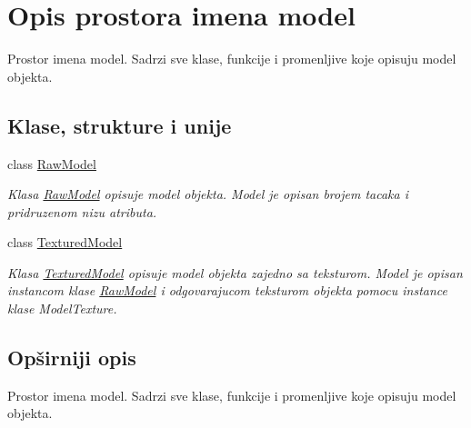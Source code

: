 \hypertarget{namespacemodel}{}\section{Opis prostora imena model}
\label{namespacemodel}


Prostor imena model. Sadrzi sve klase, funkcije i promenljive koje opisuju model objekta.  


\subsection*{Klase, strukture i unije}
\begin{DoxyCompactItemize}
\item 
class \hyperlink{classmodel_1_1RawModel}{Raw\+Model}
\begin{DoxyCompactList}\small\item\em Klasa \hyperlink{classmodel_1_1RawModel}{Raw\+Model} opisuje model objekta. Model je opisan brojem tacaka i pridruzenom nizu atributa. \end{DoxyCompactList}\item 
class \hyperlink{classmodel_1_1TexturedModel}{Textured\+Model}
\begin{DoxyCompactList}\small\item\em Klasa \hyperlink{classmodel_1_1TexturedModel}{Textured\+Model} opisuje model objekta zajedno sa teksturom. Model je opisan instancom klase \hyperlink{classmodel_1_1RawModel}{Raw\+Model} i odgovarajucom teksturom objekta pomocu instance klase Model\+Texture. \end{DoxyCompactList}\end{DoxyCompactItemize}


\subsection{Opširniji opis}
Prostor imena model. Sadrzi sve klase, funkcije i promenljive koje opisuju model objekta. 